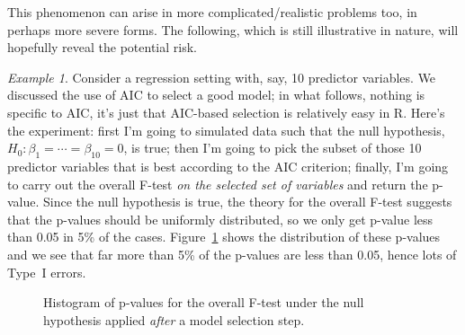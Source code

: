 \documentclass[a4paper, 12pt]{article}
\theoremstyle{plain}
\theoremstyle{definition}
\theoremstyle{remark}
\newtheorem*{example}{Example}
\begin{document}
This phenomenon can arise in more complicated/realistic problems too, in perhaps more severe forms.  The following, which is still illustrative in nature, will hopefully reveal the potential risk.

\begin{example}
Consider a regression setting with, say, 10 predictor variables.  We discussed the use of AIC to select a good model; in what follows, nothing is specific to AIC, it's just that AIC-based selection is relatively easy in R.  Here's the experiment: first I'm going to simulated data such that the null hypothesis, $H_0: \beta_1 = \cdots = \beta_{10} = 0$, is true; then I'm going to pick the subset of those 10 predictor variables that is best according to the AIC criterion; finally, I'm going to carry out the overall F-test {\em on the selected set of variables} and return the p-value.  Since the null hypothesis is true, the theory for the overall F-test suggests that the p-values should be uniformly distributed, so we only get p-value less than 0.05 in 5\% of the cases.  Figure~\ref{fig:aic.ftest} shows the distribution of these p-values and we see that far more than 5\% of the p-values are less than 0.05, hence lots of Type~I errors.  
\end{example}

\begin{figure}
\begin{center}
\end{center}
\caption{Histogram of p-values for the overall F-test under the null hypothesis applied {\em after} a model selection step.}
\label{fig:aic.ftest}
\end{figure}
\end{document}

